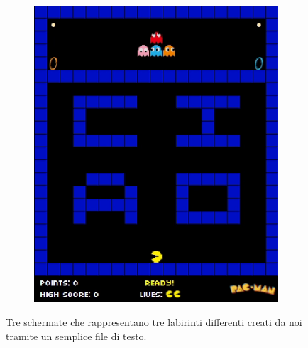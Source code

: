 \documentclass[12pt,a4paper]{report}
\begin{document}
\begin{figure}[hb!]
\begin{subfigure}{.32\textwidth}
  \caption{}
  \label{fig:snap2}
\end{subfigure}%
\begin{subfigure}{.32\textwidth}
  \centering
  \includegraphics[width=.95\linewidth]{maze4}
  \caption{}
  \label{fig:snap3}
\end{subfigure}
\caption{Tre schermate che rappresentano tre labirinti differenti creati da noi tramite un semplice file di testo.}
\label{fig:fig}
\end{figure}






\end{document}
